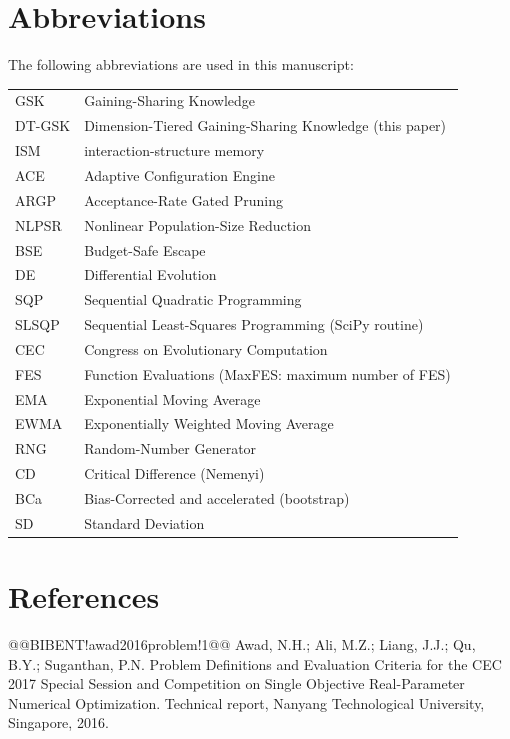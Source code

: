 \documentclass[10pt,a4paper]{article}
\newcommand{\dtgsk}{DT-GSK}
\begin{document}
\section*{Abbreviations}

The following abbreviations are used in this manuscript:\\

\noindent
\begin{tabular}{@{}ll}
GSK      & Gaining-Sharing Knowledge \\
\dtgsk{} & Dimension-Tiered Gaining-Sharing Knowledge (this paper) \\
ISM      & interaction-structure memory \\
ACE      & Adaptive Configuration Engine \\
ARGP     & Acceptance-Rate Gated Pruning \\
NLPSR    & Nonlinear Population-Size Reduction \\
BSE      & Budget-Safe Escape \\
DE       & Differential Evolution \\
SQP      & Sequential Quadratic Programming \\
SLSQP    & Sequential Least-Squares Programming (SciPy routine) \\
CEC      & Congress on Evolutionary Computation \\
FES      & Function Evaluations (MaxFES: maximum number of FES) \\
EMA      & Exponential Moving Average \\
EWMA     & Exponentially Weighted Moving Average \\
RNG      & Random-Number Generator \\
CD       & Critical Difference (Nemenyi) \\
BCa      & Bias-Corrected and accelerated (bootstrap) \\
SD       & Standard Deviation \\
\end{tabular}




\section*{References}

@@BIBENT!awad2016problem!1@@ Awad, N.H.; Ali, M.Z.; Liang, J.J.; Qu, B.Y.; Suganthan, P.N. Problem Definitions and Evaluation Criteria for the {CEC} 2017 Special Session and Competition on Single Objective Real-Parameter Numerical Optimization. Technical report, Nanyang Technological University, Singapore, 2016.
\end{document}
